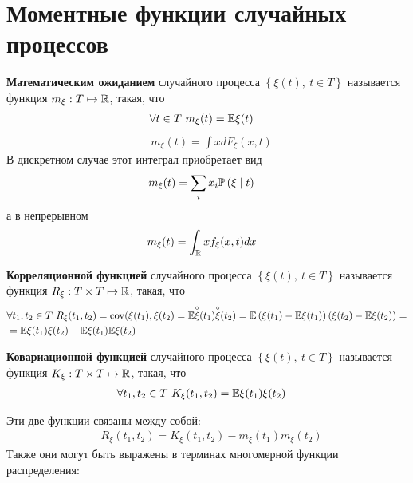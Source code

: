 {}
\section{Моментные функции случайных процессов}
\begin{Def}
    \textbf{Математическим ожиданием} случайного процесса $\left\{\xi(t), \ t \in T\right\}$ называется функция $m_\xi: T \mapsto \mathbb{R}$, такая, что
    \begin{align*}
      & \forall t \in T \ m_\xi(t) = \mathbb{E} \xi(t)
    \end{align*}
    \begin{align*}
      & m_\xi(t) = \int xdF_\xi(x,t)
    \end{align*}
    В дискретном случае этот интеграл приобретает вид
    \begin{align*}
      & m_\xi(t) = \sum_i x_i \mathbb{P}\left(\xi \mid t\right)
    \end{align*}
    а в непрерывном
    \begin{align*}
      & m_\xi(t) = \int_{\mathbb{R}} xf_\xi(x,t) dx
    \end{align*}
\end{Def}
\begin{Def}
    \textbf{Корреляционной функцией} случайного процесса $\left\{\xi(t), \ t \in T\right\}$ называется функция $R_\xi: T\times T \mapsto \mathbb{R}$, такая, что
    \begin{align*}
      & \forall t_1, t_2 \in T \ R_\xi(t_1, t_2) = \operatorname{cov}(\xi(t_1), \xi(t_2) = \mathbb{E} \overset{\circ}{\xi}(t_1)\overset{\circ}{\xi}(t_2) = \mathbb{E} \left(\xi(t_1) - \mathbb{E} \xi(t_1)\right)\left(\xi(t_2) - \mathbb{E} \xi(t_2)\right) = \\
      & = \mathbb{E} \xi(t_1)\xi(t_2) - \mathbb{E} \xi(t_1) \mathbb{E} \xi(t_2)
    \end{align*}
\end{Def}
\begin{Def}
    \textbf{Ковариационной функцией} случайного процесса $\left\{\xi(t), \ t \in T\right\}$ называется функция $K_\xi: T\times T \mapsto \mathbb{R}$, такая, что
    \begin{align*}
      & \forall t_1, t_2 \in T \ K_\xi(t_1, t_2) = \mathbb{E} \xi(t_1)\xi(t_2)
    \end{align*}
\end{Def}
Эти две функции связаны между собой:
\begin{align*}
  & R_\xi(t_1, t_2) = K_\xi(t_1, t_2) - m_\xi(t_1)m_\xi(t_2)
\end{align*}
Также они могут быть выражены в терминах многомерной функции распределения:
